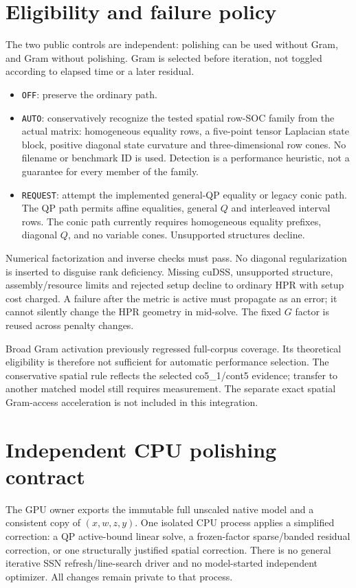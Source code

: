 \documentclass[11pt]{article}
\begin{document}
\section{Eligibility and failure policy}\label{sec:policy}
The two public controls are independent: polishing can be used without Gram,
and Gram without polishing. Gram is selected before iteration, not toggled
according to elapsed time or a later residual.
\begin{itemize}
\item \texttt{OFF}: preserve the ordinary path.
\item \texttt{AUTO}: conservatively recognize the tested spatial row-SOC
family from the actual matrix: homogeneous equality rows, a five-point tensor
Laplacian state block, positive diagonal state curvature and three-dimensional
row cones. No filename or benchmark ID is used. Detection is a performance
heuristic, not a guarantee for every member of the family.
\item \texttt{REQUEST}: attempt the implemented general-QP equality or legacy
conic path. The QP path permits affine equalities, general $Q$ and interleaved
interval rows. The conic path currently requires homogeneous equality prefixes,
diagonal $Q$, and no variable cones. Unsupported structures decline.
\end{itemize}
Numerical factorization and inverse checks must pass. No diagonal regularization
is inserted to disguise rank deficiency. Missing cuDSS, unsupported structure,
assembly/resource limits and rejected setup decline to ordinary HPR with setup
cost charged. A failure after the metric is active must propagate as an error;
it cannot silently change the HPR geometry in mid-solve. The fixed $G$ factor
is reused across penalty changes.

Broad Gram activation previously regressed full-corpus coverage. Its theoretical
eligibility is therefore not sufficient for automatic performance selection.
The conservative spatial rule reflects the selected co5\_1/cont5 evidence;
transfer to another matched model still requires measurement. The separate
exact spatial Gram-access acceleration is not included in this integration.

\section{Independent CPU polishing contract}
The GPU owner exports the immutable full unscaled native model and a consistent
copy of $(x,w,z,y)$. One isolated CPU process applies a simplified correction:
a QP active-bound linear solve, a frozen-factor sparse/banded residual
correction, or one structurally justified spatial correction. There is no
general iterative SSN refresh/line-search driver and no model-started independent
optimizer. All changes remain private to that process.
\end{document}
